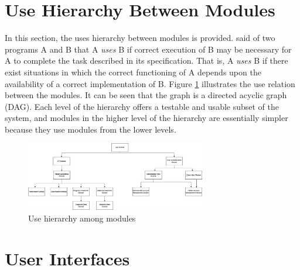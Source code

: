 \documentclass[12pt, titlepage]{article}
\begin{document}
\section{Use Hierarchy Between Modules} \label{SecUse}

In this section, the uses hierarchy between modules is
provided. \citet{Parnas1978} said of two programs A and B that A {\em uses} B if
correct execution of B may be necessary for A to complete the task described in
its specification. That is, A {\em uses} B if there exist situations in which
the correct functioning of A depends upon the availability of a correct
implementation of B.  Figure \ref{FigUH} illustrates the use relation between
the modules. It can be seen that the graph is a directed acyclic graph
(DAG). Each level of the hierarchy offers a testable and usable subset of the
system, and modules in the higher level of the hierarchy are essentially simpler
because they use modules from the lower levels.



\begin{figure}[H]
\centering
\includegraphics[width=0.7\textwidth]{use-hierarchy.png}
\caption{Use hierarchy among modules}
\label{FigUH}
\end{figure}


\section{User Interfaces}
\end{document}
